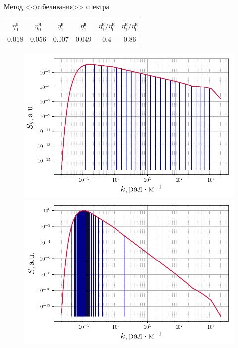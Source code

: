 \begin{frame}[t]{}
\begin{columns}[t]
\begin{column}{.48\linewidth}
\begin{block}{Метод <<отбеливания>> спектра}
                \begin{center}
                    
                \begin{tabular}{|c|c|c|c|c|c|}
                    $\eta_0^{\text{в}}$ & $\eta_0^{\text{н}}$ & $\eta_1^{\text{н}}$ & $\eta_1^{\text{в}}$ & $\eta_1^{\text{н}}/\eta_0^{\text{н}}$ & $\eta_1^{\text{н}}/\eta_0^{\text{н}}$ \\ [0.5ex]

                \hline 
                    0.018 & 0.056 & 0.007 & 0.049 & 0.4 & 0.86
             \end{tabular}
                \end{center}
                \begin{figure}[H]
                    \begin{minipage}{0.32\linewidth}
                            \centering
                            \includegraphics[width=\linewidth]{fig/split_angles}	
                    \end{minipage}
                    \hfill
                    \begin{minipage}{0.32\linewidth}
                            \centering
                            \includegraphics[width=\linewidth]{fig/split_height}

\end{minipage}
\end{figure}
\end{block}
\end{column}
\end{columns}
\end{frame}
